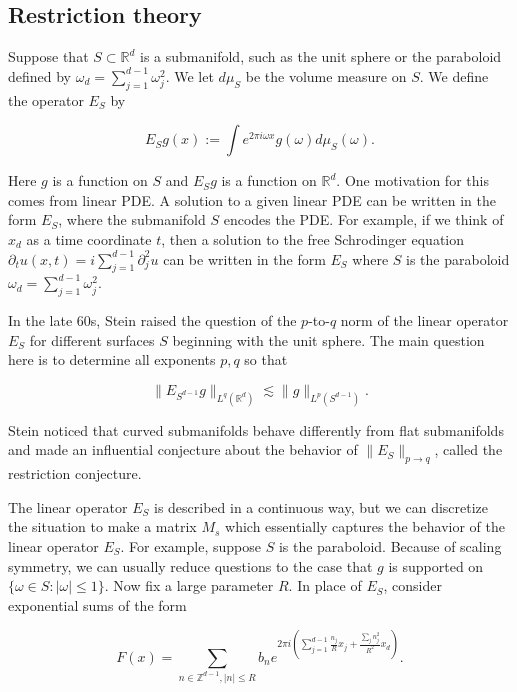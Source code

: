 \documentclass{amsart}
\newcommand{\ZZ}{\mathbb{Z}}
\newcommand{\RR}{\mathbb{R}}
\begin{document}
\subsection{Restriction theory}

Suppose that $S \subset \RR^d$ is a submanifold, such as the unit sphere or the paraboloid defined by $\omega_d = \sum_{j = 1}^{d-1} \omega_j^2$.  We let $d \mu_S$ be the volume measure on $S$.  We define the operator $E_S$ by

\begin{equation} \label{defEs}
E_S g (x) := \int e^{2 \pi i \omega x} g(\omega) d \mu_S(\omega). 
\end{equation}

Here $g$ is a function on $S$ and $E_S g$ is a function on $\RR^d$.  One motivation for this comes from linear PDE.  A solution to a given linear PDE can be written in the form $E_S$, where the submanifold $S$ encodes the PDE.  For example, if we think of $x_d$ as a time coordinate $t$, then a solution to the free Schrodinger equation $\partial_t u(x,t) = i \sum_{j=1}^{d-1} \partial_j^2 u$ can be written in the form $E_S$ where $S$ is the paraboloid $\omega_d = \sum_{j=1}^{d-1} \omega_j^2$.

In the late 60s, Stein raised the question of the $p$-to-$q$ norm of the linear operator $E_S$ for different surfaces $S$ beginning with the unit sphere.  The main question here is to determine all exponents $p,q$ so that

\begin{equation} \label{restr}  \| E_{S^{d-1}} g \|_{L^q(\RR^d)} \lesssim \| g \|_{L^p(S^{d-1})}. \end{equation}

\noindent Stein noticed that curved submanifolds behave differently from flat submanifolds and made an influential conjecture about the behavior of $\| E_S \|_{p \rightarrow q}$, called the restriction conjecture.

The linear operator $E_S$ is described in a continuous way, but we can discretize the situation to make a matrix $M_s$ which essentially captures the behavior of the linear operator $E_S$.  For example, suppose $S$ is the paraboloid.  Because of scaling symmetry, we can usually reduce questions to the case that $g$ is supported on $\{ \omega \in S: |\omega| \le 1 \}$.  Now fix a large parameter $R$.  In place of $E_S$, consider exponential sums of the form

\begin{equation} \label{trigpoly}
 F(x) = \sum_{n \in \ZZ^{d-1}, |n| \le R} b_n e^{2 \pi i ( \sum_{j=1}^{d-1} \frac{n_j}{R} x_j + \frac{ \sum_j n_j^2}{R^2} x_d ) } . 
\end{equation}
\end{document}
